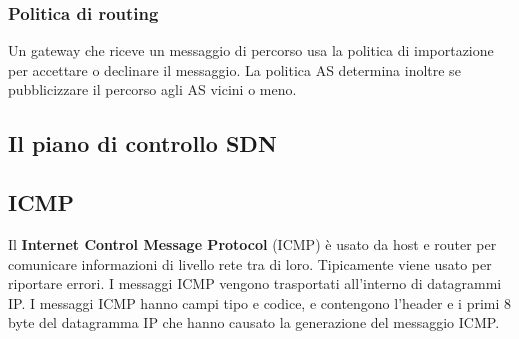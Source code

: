 \documentclass[11pt]{article}
\begin{document}
\subsubsection{Politica di routing}
Un gateway che riceve un messaggio di percorso usa la politica di importazione per accettare o declinare il messaggio. 
La politica AS determina inoltre se pubblicizzare il percorso agli AS vicini o meno.
\subsection{Il piano di controllo SDN}

\subsection{ICMP}
Il \textbf{Internet Control Message Protocol} (ICMP) è usato da host e router per comunicare informazioni di livello rete 
tra di loro. Tipicamente viene usato per riportare errori. I messaggi ICMP vengono trasportati all'interno di datagrammi 
IP. I messaggi ICMP hanno campi tipo e codice, e contengono l'header e i primi 8 byte del datagramma IP che hanno causato 
la generazione del messaggio ICMP.
\end{document}
